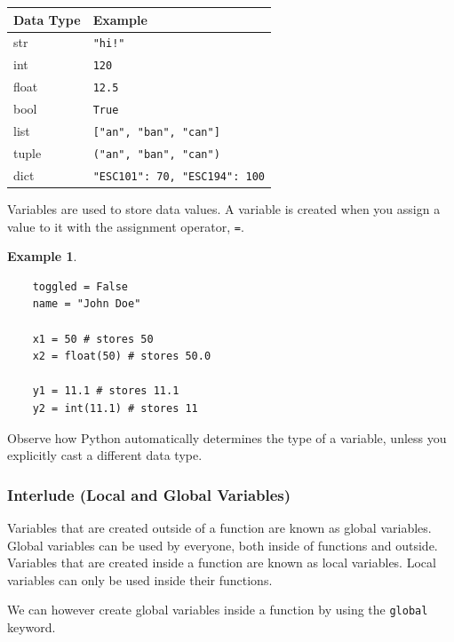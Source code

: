 \documentclass[11pt]{scrartcl}
\theoremstyle{definition}
\newtheorem*{example}{Example}
\begin{document}
\begin{center}
\begin{tabular}{|l|l|} \hline
    \textbf{Data Type} & \textbf{Example} \\ \hline
    str & \texttt{"hi!"} \\ \hline
    int & \texttt{120} \\ \hline
    float & \texttt{12.5} \\ \hline
    bool & \texttt{True} \\ \hline
    list & \texttt{["an", "ban", "can"]} \\ \hline
    tuple & \texttt{("an", "ban", "can")} \\ \hline
    dict & \texttt{{"ESC101": 70, "ESC194": 100}} \\ \hline
\end{tabular}
\end{center}

Variables are used to store data values. A variable is created when you assign a value to it with the assignment
operator, \texttt{=}.

\begin{example}
    \
\begin{verbatim}
    toggled = False
    name = "John Doe"

    x1 = 50 # stores 50
    x2 = float(50) # stores 50.0

    y1 = 11.1 # stores 11.1
    y2 = int(11.1) # stores 11
\end{verbatim}
\end{example}

Observe how Python automatically determines the type of a variable, unless you explicitly cast a different data
type.

\subsubsection{Interlude (Local and Global Variables)}

Variables that are created outside of a function are known as global variables. Global variables can be used by 
everyone, both inside of functions and outside. Variables that are created inside a function are known as local 
variables. Local variables can only be used inside their functions. 

We can however create global variables inside a function by using the \texttt{global} keyword.
\end{document}
